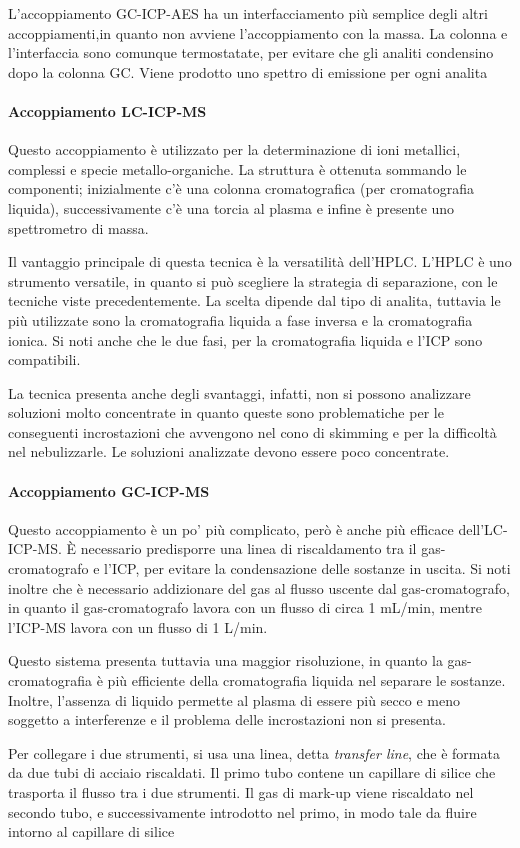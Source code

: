 L'accoppiamento GC-ICP-AES ha un interfacciamento più semplice degli altri accoppiamenti,in quanto non avviene l'accoppiamento con la massa.
La colonna e l'interfaccia sono comunque termostatate, per evitare che gli analiti condensino dopo la colonna GC.
Viene prodotto uno spettro di emissione per ogni analita

\paragraph{Accoppiamento LC-ICP-MS}
Questo accoppiamento è utilizzato per la determinazione di ioni metallici, complessi e specie metallo-organiche.
La struttura è ottenuta sommando le componenti; inizialmente c'è una colonna cromatografica (per cromatografia liquida), successivamente c'è una torcia al plasma e infine è presente uno spettrometro di massa.

Il vantaggio principale di  questa tecnica è la versatilità dell'HPLC.
L'HPLC è uno strumento versatile, in quanto si può scegliere la strategia di separazione, con le tecniche viste precedentemente.
La scelta dipende dal tipo di analita, tuttavia le più utilizzate sono la cromatografia liquida a fase inversa e la cromatografia ionica.
Si noti anche che le due fasi, per la cromatografia liquida e l'ICP sono compatibili.

La tecnica presenta anche degli svantaggi, infatti, non si possono analizzare soluzioni molto concentrate in quanto queste sono problematiche per le conseguenti incrostazioni
che avvengono nel cono di skimming e per la difficoltà nel nebulizzarle.
Le soluzioni analizzate devono essere poco concentrate.

\paragraph{Accoppiamento GC-ICP-MS}
Questo accoppiamento è un po' più complicato, però è anche più efficace dell'LC-ICP-MS.
È necessario predisporre una linea di riscaldamento tra il gas-cromatografo e l'ICP, per evitare la condensazione delle sostanze in uscita.
Si noti inoltre che è necessario addizionare del gas al flusso uscente dal gas-cromatografo, in quanto il gas-cromatografo lavora con un flusso di circa 1 mL/min, mentre l'ICP-MS lavora con un flusso di 1 L/min.


Questo sistema presenta tuttavia una maggior risoluzione, in quanto la gas-cromatografia è più efficiente della cromatografia liquida nel separare le sostanze.
Inoltre, l'assenza di liquido permette al plasma di essere più secco e meno soggetto a interferenze e il problema delle incrostazioni non si presenta.

Per collegare i due strumenti, si usa una linea, detta \emph{transfer line}, che è formata da due tubi di acciaio riscaldati.
Il primo tubo contene un capillare di silice che trasporta il flusso tra i due strumenti.
Il gas di mark-up viene riscaldato nel secondo tubo, e successivamente introdotto nel primo, in modo tale da fluire intorno al capillare di silice
